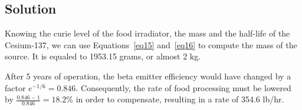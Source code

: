 \subsection{Solution}

Knowing the curie level of the food irradiator, the mass and the half-life of the Cesium-137, we can use Equations~\ref{eq15} and~\ref{eq16} to compute the mass of the source. It is equaled to 1953.15 grams, or almost 2 kg.

After 5 years of operation, the beta emitter efficiency would have changed by a factor $e^{-1/6} = 0.846$. Consequently, the rate of food processing must be lowered by $\frac{0.846 - 1}{0.846} = 18.2\%$ in order to compensate, resulting in a rate of 354.6 lb/hr.



